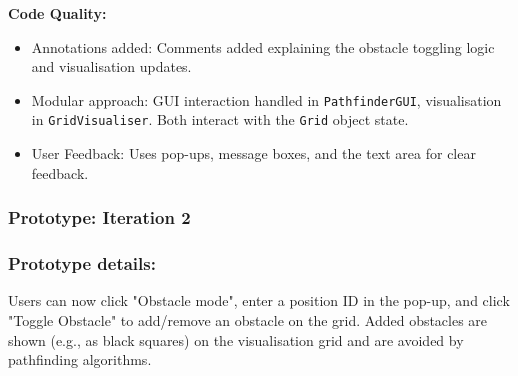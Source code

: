 \textbf{Code Quality:}
\begin{itemize}
	\item Annotations added: Comments added explaining the obstacle toggling logic and visualisation updates.
	\item Modular approach: GUI interaction handled in \verb|PathfinderGUI|, visualisation in \verb|GridVisualiser|. Both interact with the \verb|Grid| object state.
	\item User Feedback: Uses pop-ups, message boxes, and the text area for clear feedback.
\end{itemize}

\subsubsection*{Prototype: Iteration 2}




\subsubsection{Prototype details:}
Users can now click "Obstacle mode", enter a position ID in the pop-up, and click "Toggle Obstacle" to add/remove an obstacle on the grid. Added obstacles are shown (e.g., as black squares) on the visualisation grid and are avoided by pathfinding algorithms.

